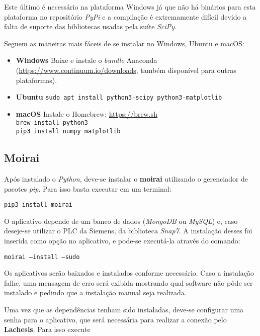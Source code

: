 Este último é necessário na plataforma Windows já que não há binários para esta
plataforma no repositório \textit{PyPi} e a compilação é extremamente difícil
devido a falta de suporte das bibliotecas usadas pela suíte \textit{SciPy}.

Seguem as maneiras mais fáceis de se instalar no Windows, Ubuntu e macOS:

\begin{itemize}
\item \textbf{Windows}
        Baixe e instale o \textit{bundle} Anaconda
        (\url{https://www.continuum.io/downloads}, também disponível para outras
        plataformas).

\item \textbf{Ubuntu}
        \texttt{sudo apt install python3-scipy python3-matplotlib}

\item \textbf{macOS}
        Instale o Homebrew: \url{https://brew.sh}\\
        \texttt{brew install python3}\\
        \texttt{pip3 install numpy matplotlib}
\end{itemize}

\subsection{Moirai}%
\label{subsec:install-moirai}

Após instalado o \textit{Python}, deve-se instalar o \textbf{moirai} utilizando
o gerenciador de pacotes \textit{pip}. Para isso basta executar em um terminal:

\texttt{pip3 install moirai}

O aplicativo depende de um banco de dados (\textit{MongoDB} ou \textit{MySQL})
e, caso deseje-se utilizar o PLC da Siemens, da biblioteca \textit{Snap7}. A
instalação desses foi inserida como opção no aplicativo, e pode-se executá-la
através do comando:

\texttt{moirai --install --sudo}

Os aplicativos serão baixados e instalados conforme necessário. Caso a
instalação falhe, uma mensagem de erro será exibida mostrando qual software não
pôde ser instalado e pedindo que a instalação manual seja realizada.

Uma vez que as dependências tenham sido instaladas, deve-se configurar uma senha
para o aplicativo, que será necessária para realizar a conexão pelo
\textbf{Lachesis}. Para isso execute

